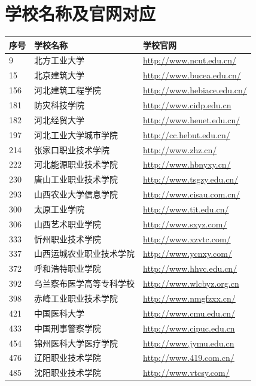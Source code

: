 \documentclass[logo,reportComp]{thesis}
\begin{document}
\section{学校名称及官网对应}
\label{app:school}
\begin{longtable}{|l|l|l|}
\hline
序号 & 学校名称 & 学校官网\\\hline
9 & 北方工业大学 & \url{http://www.ncut.edu.cn/}\\\hline
15 & 北京建筑大学 & \url{http://www.bucea.edu.cn/}\\\hline
156 & 河北建筑工程学院 & \url{http://www.hebiace.edu.cn/}\\\hline
181 & 防灾科技学院 & \url{http://www.cidp.edu.cn}\\\hline
182 & 河北经贸大学 & \url{http://www.heuet.edu.cn/}\\\hline
197 & 河北工业大学城市学院 & \url{http://cc.hebut.edu.cn/}\\\hline
214 & 张家口职业技术学院 & \url{http://www.zhz.cn/}\\\hline
222 & 河北能源职业技术学院 & \url{http://www.hbnyxy.cn/}\\\hline
230 & 唐山工业职业技术学院 & \url{http://www.tsgzy.edu.cn/}\\\hline
293 & 山西农业大学信息学院 & \url{http://www.cisau.com.cn/}\\\hline
300 & 太原工业学院 & \url{http://www.tit.edu.cn/}\\\hline
306 & 山西艺术职业学院 & \url{http://www.sxyz.com/}\\\hline
333 & 忻州职业技术学院 & \url{http://www.xzvtc.com/}\\\hline
337 & 山西运城农业职业技术学院 & \url{http://www.ycnxy.com/}\\\hline
372 & 呼和浩特职业学院 & \url{http://www.hhvc.edu.cn/}\\\hline
392 & 乌兰察布医学高等专科学校 & \url{http://www.wlcbyz.org.cn}\\\hline
398 & 赤峰工业职业技术学院 & \url{http://www.nmgfzxx.cn/}\\\hline
421 & 中国医科大学 & \url{http://www.cmu.edu.cn/}\\\hline
433 & 中国刑事警察学院 & \url{http://www.cipuc.edu.cn}\\\hline
454 & 锦州医科大学医疗学院 & \url{http://www.jymu.edu.cn}\\\hline
476 & 辽阳职业技术学院 & \url{http://www.419.com.cn/}\\\hline
485 & 沈阳职业技术学院 & \url{http://www.vtcsy.com/}\\\hline

\end{longtable}
\end{document}
